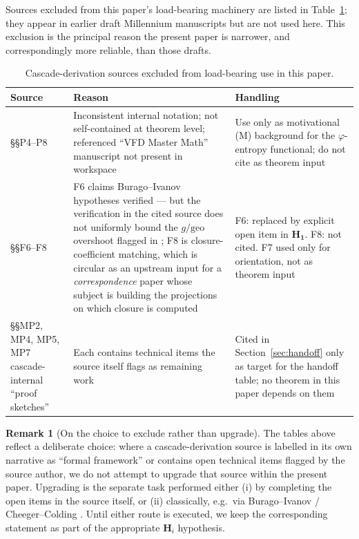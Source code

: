 \documentclass[11pt, a4paper]{amsart}
\theoremstyle{definition}
\newtheorem{remark}[theorem]{Remark}
\newcommand{\pphi}{\varphi}
\begin{document}
Sources excluded from this paper's load-bearing machinery are
listed in Table~\ref{tab:exclusions}; they appear in earlier draft
Millennium manuscripts but are not used here. This exclusion is
the principal reason the present paper is narrower, and
correspondingly more reliable, than those drafts.

\begin{table}[h]
\caption{Cascade-derivation sources excluded from load-bearing use
in this paper.}
\label{tab:exclusions}
\begin{tabular}{llp{2.8in}}
\hline
Source & Reason & Handling \\
\hline
\cite{CascadePregeometry} \S\S P4--P8 & Inconsistent internal
  notation; not self-contained at theorem level; referenced
  ``VFD Master Math'' manuscript not present in workspace &
  Use only as motivational (M) background for the $\pphi$-entropy
  functional; do not cite as theorem input \\
\cite{CascadeFoundations} \S\S F6--F8 & F6 claims Burago--Ivanov
  hypotheses verified --- but the verification in the cited
  source does not uniformly bound the $g/\mathrm{geo}$ overshoot
  flagged in \cite[\S C2.bis]{CascadeGR}; F8 is
  closure-coefficient matching, which is circular as an upstream
  input for a \emph{correspondence} paper whose subject is
  building the projections on which closure is computed &
  F6: replaced by explicit open item in $\mathbf{H_1}$. F8: not
  cited. F7 used only for orientation, not as theorem input \\
\cite{CascadeMillennium} \S\S MP2, MP4, MP5, MP7 cascade-internal
  ``proof sketches'' & Each contains technical items the source
  itself flags as remaining work & Cited in
  Section~\ref{sec:handoff} only as target for the handoff table;
  no theorem in this paper depends on them \\
\hline
\end{tabular}
\end{table}

\begin{remark}[On the choice to exclude rather than upgrade]
\label{rmk:exclude-not-upgrade}
The tables above reflect a deliberate choice: where a
cascade-derivation source is labelled in its own narrative as
``formal framework'' or contains open technical items flagged by
the source author, we do not attempt to upgrade that source within
the present paper. Upgrading is the separate task performed either
(i) by completing the open items in the source itself, or (ii)
classically, e.g.\ via Burago--Ivanov
\cite{BuragoBuragoIvanov} / Cheeger--Colding
\cite{CheegerColding1997}. Until either route is executed, we keep
the corresponding statement as part of the appropriate
$\mathbf{H}_i$ hypothesis.
\end{remark}
\end{document}
